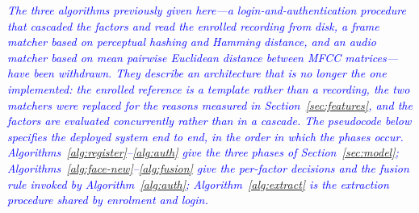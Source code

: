 \documentclass[10pt,journal,compsoc]{IEEEtran}
\begin{document}
\textcolor{blue}{\emph{The three algorithms previously given here---a login-and-authentication procedure that cascaded the factors and read the enrolled recording from disk, a frame matcher based on perceptual hashing and Hamming distance, and an audio matcher based on mean pairwise Euclidean distance between MFCC matrices---have been withdrawn. They describe an architecture that is no longer the one implemented: the enrolled reference is a template rather than a recording, the two matchers were replaced for the reasons measured in Section~\ref{sec:features}, and the factors are evaluated concurrently rather than in a cascade. The pseudocode below specifies the deployed system end to end, in the order in which the phases occur. Algorithms~\ref{alg:register}--\ref{alg:auth} give the three phases of Section~\ref{sec:model}; Algorithms~\ref{alg:face-new}--\ref{alg:fusion} give the per-factor decisions and the fusion rule invoked by Algorithm~\ref{alg:auth}; Algorithm~\ref{alg:extract} is the extraction procedure shared by enrolment and login.}}
\end{document}
